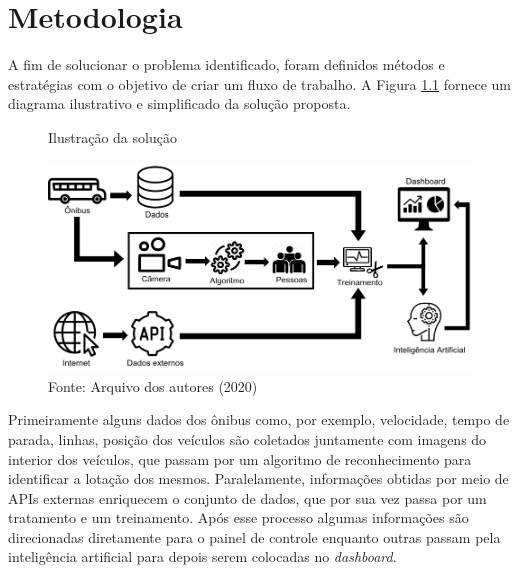 \chapter{Metodologia}
\label{Cap:MateriaisMetodos}

\indent
\par A fim de solucionar o problema identificado, foram definidos métodos e estratégias com o objetivo de criar um fluxo de trabalho. A Figura \ref{DiagramaDeBlocosIcones} fornece um diagrama ilustrativo e simplificado da solução proposta.

\begin{figure}[H]
    \centering
    \caption{Ilustração da solução}
    \includegraphics[width=1.0\linewidth]{Imagens/DiagramaDeBlocosIcones.png}
    \caption*{Fonte: Arquivo dos autores (2020)}
    \label{DiagramaDeBlocosIcones}
\end{figure}

\indent
\par Primeiramente alguns dados dos ônibus como, por exemplo, velocidade, tempo de parada, linhas, posição dos veículos são coletados juntamente com imagens do interior dos veículos, que passam por um algoritmo de reconhecimento para identificar a lotação dos mesmos. Paralelamente, informações obtidas por meio de APIs externas enriquecem o conjunto de dados, que por sua vez passa por um tratamento e um treinamento. Após esse processo algumas informações são direcionadas diretamente para o painel de controle enquanto outras passam pela inteligência artificial para depois serem colocadas no \textit{dashboard}.

